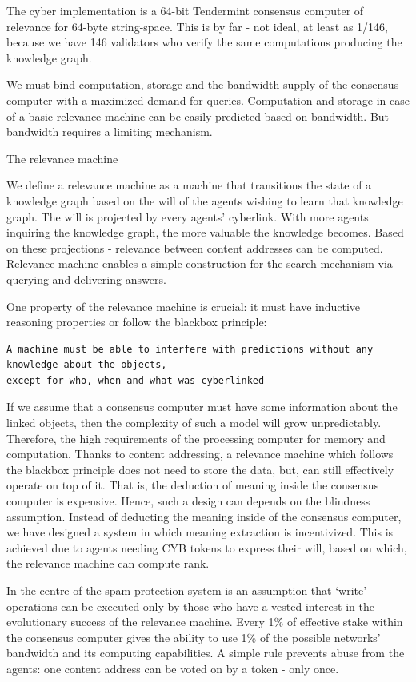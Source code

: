 \documentclass[8pt,oneside]{amsart}
\makeatletter
\renewcommand\subsection{\@startsection{subsection}
                                    {2}{\z@}
                                    {-3.25ex\@plus -1ex \@minus -.2ex}
                                    {0ex \@plus .2ex}
                                    {\play\Large}
                        }
\newcommand{\titleSection}[1]{\subsection{#1}}
\newcommand{\code}[1]{{\PlayBold #1}}
\makeatother
\begin{document}
The \code{cyber} implementation is a 64-bit Tendermint consensus computer of relevance for 64-byte string-space. This is by far - not ideal, at least as 1/146, because we have 146 validators who verify the same computations producing the knowledge graph.

We must bind computation, storage and the bandwidth supply of the consensus computer with a maximized demand for queries. Computation and storage in case of a basic \code{relevance machine} can be easily predicted based on bandwidth. But bandwidth requires a limiting mechanism.

\titleSection{The relevance machine}\label{relevance-machine}

We define a relevance machine as a machine that transitions the state of a knowledge graph based on the will of the agents wishing to learn that knowledge graph. The will is projected by every agents' cyberlink. With more agents inquiring the knowledge graph, the more valuable the knowledge becomes. Based on these projections - relevance between content addresses can be computed. Relevance machine enables a simple construction for the search mechanism via querying and delivering answers.

One property of the relevance machine is crucial: it must have inductive reasoning properties or follow the blackbox principle:

\begin{lstlisting}
A machine must be able to interfere with predictions without any knowledge about the objects,
except for who, when and what was cyberlinked
\end{lstlisting}

If we assume that a consensus computer must have some information about the linked objects, then the complexity of such a model will grow unpredictably. Therefore, the high requirements of the processing computer for memory and computation. Thanks to content addressing, a relevance machine which follows the blackbox principle does not need to store the data, but, can still effectively operate on top of it. That is, the deduction of meaning inside the consensus computer is expensive. Hence, such a design can depends on the blindness assumption. Instead of deducting the meaning inside of the consensus computer, we have designed a system in which meaning extraction is incentivized. This is achieved due to agents needing CYB tokens to express their will, based on which, the relevance machine can compute rank.

In the centre of the spam protection system is an assumption that ‘write’ operations can be executed only by those who have a vested interest in the evolutionary success of the relevance machine. Every 1\% of effective stake within the consensus computer gives the ability to use 1\% of the possible networks' bandwidth and its computing capabilities. A simple rule prevents abuse from the agents: one content address can be voted on by a token - only once.
\end{document}
